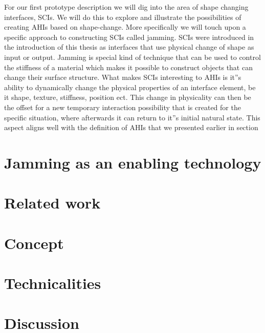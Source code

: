 For our first prototype description we will dig into the area of shape changing interfaces, SCIs.
We will do this to explore and illustrate the possibilities of creating AHIs based on shape-change.
More specifically we will touch upon a specific approach to constructing SCIs called jamming.
SCIs were introduced in the introduction of this thesis as interfaces that use physical change of shape as input or output.
Jamming is special kind of technique that can be used to control the stiffness of a material which makes it possible to construct objects that can change their surface structure.
What makes SCIs interesting to AHIs is it''s ability to dynamically change the physical properties of an interface element, be it shape, texture, stiffness, position ect.
This change in physicality can then be the offset for a new temporary interaction possibility that is created for the specific situation, where afterwards it can return to it''s initial natural state.
This aspect aligns well with the definition of AHIs that we presented earlier in section  

\section{Jamming as an enabling technology}
\label{ch:jamming:enabling-technology} 


\section{Related work}
\label{ch:jamming:related-work} 


\section{Concept}

\section{Technicalities}
\section{Discussion}
